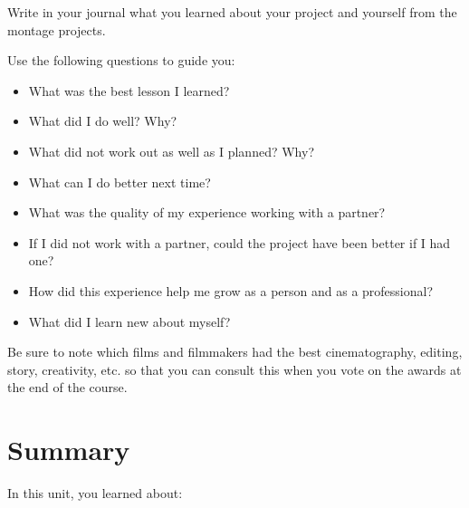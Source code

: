 \documentclass[
]{book}
\providecommand{\tightlist}{%
  \setlength{\itemsep}{0pt}\setlength{\parskip}{0pt}}
\begin{document}
\begin{reflect}
Write in your journal what you learned about your project and yourself from the montage projects.

Use the following questions to guide you:

\begin{itemize}
\tightlist
\item
  What was the best lesson I learned?\\
\item
  What did I do well? Why?\\
\item
  What did not work out as well as I planned? Why?\\
\item
  What can I do better next time?\\
\item
  What was the quality of my experience working with a partner?\\
\item
  If I did not work with a partner, could the project have been better if I had one?\\
\item
  How did this experience help me grow as a person and as a professional?\\
\item
  What did I learn new about myself?
\end{itemize}

Be sure to note which films and filmmakers had the best cinematography, editing, story, creativity, etc. so that you can consult this when you vote on the awards at the end of the course.
\end{reflect}

\hypertarget{summary-6}{%
\section*{Summary}\label{summary-6}}

In this unit, you learned about:
\end{document}
